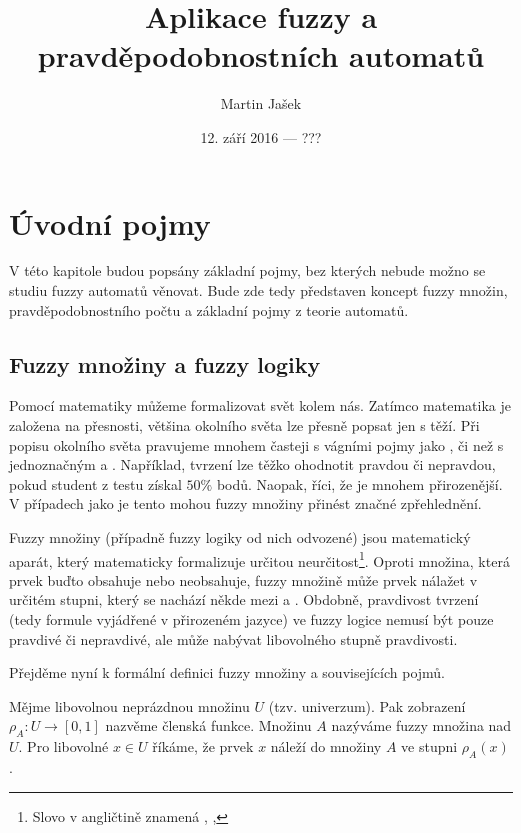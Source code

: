 \documentclass[a4paper,10pt]{article}
\title{Aplikace fuzzy a pravděpodobnostních automatů}
\author{Martin Jašek}
\date{12. září 2016 --- ???}
\begin{document}
\maketitle
\tableofcontents
\newpage

\section{Úvodní pojmy}
V této kapitole budou popsány základní pojmy, bez kterých nebude možno se studiu fuzzy automatů věnovat. Bude zde tedy představen koncept fuzzy množin, pravděpodobnostního počtu a základní pojmy z teorie automatů.

\subsection{Fuzzy množiny a fuzzy logiky}
Pomocí matematiky můžeme formalizovat svět kolem nás. Zatímco matematika je založena na přesnosti, většina okolního světa lze přesně popsat jen s těží. Při popisu okolního světa pravujeme mnohem časteji s vágními pojmy jako ,  či  než s jednoznačným  a . Například, tvrzení  lze těžko ohodnotit pravdou či nepravdou, pokud student z testu získal $50\%$ bodů. Naopak, říci, že  je mnohem přirozenější. V případech jako je tento mohou fuzzy množiny přinést značné zpřehlednění.

Fuzzy množiny (případně fuzzy logiky od nich odvozené) jsou matematický aparát, který matematicky formalizuje určitou neurčitost\footnote{Slovo  v angličtině znamená , , }. Oproti  množina, která prvek buďto obsahuje nebo neobsahuje, fuzzy množině může prvek nálažet v určitém stupni, který se nachází někde mezi  a . Obdobně, pravdivost tvrzení (tedy formule vyjádřené v přirozeném jazyce) ve fuzzy logice nemusí být pouze pravdivé či nepravdivé, ale může nabývat libovolného stupně pravdivosti.

Přejděme nyní k formální definici fuzzy množiny a souvisejících pojmů.

\begin{definition}
 Mějme libovolnou neprázdnou množinu $U$ (tzv. univerzum). Pak zobrazení $\rho_A: U \rightarrow [0, 1]$ nazvěme členská funkce. Množinu $A$ nazýváme fuzzy množina nad $U$. Pro libovolné $x \in U$ říkáme, že prvek $x$ náleží do množiny $A$ ve stupni $\rho_A(x)$.
\end{definition}
\end{document}
